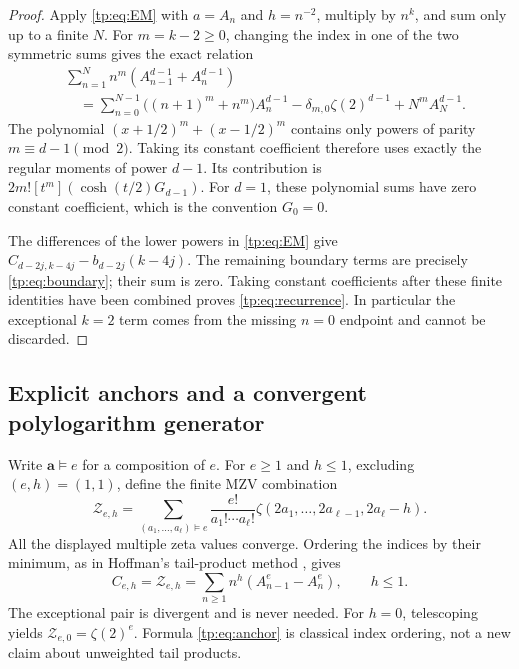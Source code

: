 \begin{proof}
Apply \eqref{tp:eq:EM} with $a=A_n$ and $h=n^{-2}$, multiply by
$n^k$, and sum only up to a finite $N$.  For $m=k-2\geq0$, changing
the index in one of the two symmetric sums gives the exact relation
\begin{align*}
 &\sum_{n=1}^N n^m(A_{n-1}^{d-1}+A_n^{d-1})\\
 &\quad=\sum_{n=0}^{N-1}\bigl((n+1)^m+n^m\bigr)A_n^{d-1}
       -\delta_{m,0}\zeta(2)^{d-1}+N^mA_N^{d-1}.
\end{align*}
The polynomial $(x+1/2)^m+(x-1/2)^m$ contains only powers of
parity $m\equiv d-1\pmod2$.  Taking its constant coefficient therefore
uses exactly the regular moments of power $d-1$.  Its contribution is
$2m![t^m](\cosh(t/2)G_{d-1})$.  For $d=1$, these polynomial sums have
zero constant coefficient, which is the convention $G_0=0$.

The differences of the lower powers in \eqref{tp:eq:EM} give
$C_{d-2j,k-4j}-b_{d-2j}(k-4j)$.  The remaining boundary terms are
precisely \eqref{tp:eq:boundary}; their sum is zero.  Taking constant
coefficients after these finite identities have been combined proves
\eqref{tp:eq:recurrence}.  In particular the exceptional $k=2$ term
comes from the missing $n=0$ endpoint and cannot be discarded.
\end{proof}

\subsection{Explicit anchors and a convergent polylogarithm generator}

Write $\boldsymbol a\vDash e$ for a composition of $e$.  For $e\geq1$
and $h\leq1$, excluding $(e,h)=(1,1)$, define the finite MZV combination
\begin{equation}\label{tp:eq:anchor}
 \mathcal Z_{e,h}=
 \sum_{(a_1,\ldots,a_\ell)\vDash e}
 \frac{e!}{a_1!\cdots a_\ell!}
 \zeta(2a_1,\ldots,2a_{\ell-1},2a_\ell-h).
\end{equation}
All the displayed multiple zeta values converge.  Ordering the indices
by their minimum, as in Hoffman's tail-product method \cite{HoffmanTails},
gives
\begin{equation}\label{tp:eq:anchorseries}
 C_{e,h}=\mathcal Z_{e,h}
 =\sum_{n\geq1}n^h(A_{n-1}^e-A_n^e),\qquad h\leq1.
\end{equation}
The exceptional pair is divergent and is never needed.  For $h=0$,
telescoping yields $\mathcal Z_{e,0}=\zeta(2)^e$.  Formula
\eqref{tp:eq:anchor} is classical index ordering, not a new claim about
unweighted tail products.

